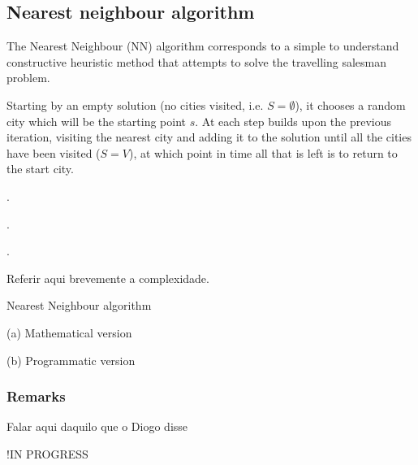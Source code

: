 \subsection{Nearest neighbour algorithm} \label{algorithm-tsp-nn}
The Nearest Neighbour (NN) algorithm corresponds to a simple to understand constructive heuristic method that attempts to solve the travelling salesman problem.\par
Starting by an empty solution (no cities visited, i.e. $S=\emptyset$), it chooses a random city which will be the starting point $s$. At each step builds upon the previous iteration, visiting the nearest city and adding it to the solution until all the cities have been visited ($S = V$), at which point in time all that is left is to return to the start city.\par
\par.\par.\par.\par Referir aqui brevemente a complexidade.

\vspace{-1em}
\begin{center}
    \begin{algorithm}[ht]
        \caption{Nearest Neighbour algorithm}
        \label{alg:nearest neighbour}
        \begin{minipage}[t]{0.49\linewidth}
            (a) Mathematical version
            \begin{algorithmic}[1]
                \EndWhile
                \EndFunction
            \end{algorithmic}
            
        \end{minipage}
        \begin{minipage}[t]{0.49\linewidth}
            (b) Programmatic version
            
        \end{minipage}
    \end{algorithm}
\end{center}

\subsubsection{Remarks}
Falar aqui daquilo que o Diogo disse


\par
!IN PROGRESS
